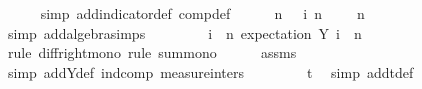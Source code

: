 \begin{isabellebody}
\ \ \ \ \isamarkupfalse%
\ {\isacharparenleft}{\kern0pt}simp\ add{\isacharcolon}{\kern0pt}indicator{\isacharunderscore}{\kern0pt}def\ comp{\isacharunderscore}{\kern0pt}def{\isacharparenright}{\kern0pt}\isanewline
\isanewline
\ \ \isamarkupfalse%
\ {\isachardoublequoteopen}{\isasymalpha}\ {\isacharasterisk}{\kern0pt}\ n\ {\isasymle}\ {\isacharparenleft}{\kern0pt}{\isasymSum}\ i\ {\isacharequal}{\kern0pt}{}{\isachardot}{\kern0pt}{\isachardot}{\kern0pt}{\isacharless}{\kern0pt}n{\isachardot}{\kern0pt}\ {}{\isacharslash}{\kern0pt}{}\ {\isacharplus}{\kern0pt}\ {\isasymalpha}{\isacharparenright}{\kern0pt}\ {\isacharminus}{\kern0pt}\ n{\isacharslash}{\kern0pt}{}{\isachardoublequoteclose}\isanewline
\ \ \ \ \isamarkupfalse%
\ {\isacharparenleft}{\kern0pt}simp\ add{\isacharcolon}{\kern0pt}algebra{\isacharunderscore}{\kern0pt}simps{\isacharparenright}{\kern0pt}\isanewline
\ \ \isamarkupfalse%
\ \isamarkupfalse%
\ {\isachardoublequoteopen}{\isachardot}{\kern0pt}{\isachardot}{\kern0pt}{\isachardot}{\kern0pt}\ {\isasymle}\ {\isacharparenleft}{\kern0pt}{\isasymSum}\ i\ {\isacharequal}{\kern0pt}\ {}{\isachardot}{\kern0pt}{\isachardot}{\kern0pt}{\isacharless}{\kern0pt}n{\isachardot}{\kern0pt}\ expectation\ {\isacharparenleft}{\kern0pt}Y\ i{\isacharparenright}{\kern0pt}{\isacharparenright}{\kern0pt}\ {\isacharminus}{\kern0pt}\ n{\isacharslash}{\kern0pt}{}{\isachardoublequoteclose}\isanewline
\ \ \ \ \isamarkupfalse%
\ {\isacharparenleft}{\kern0pt}rule\ diff{\isacharunderscore}{\kern0pt}right{\isacharunderscore}{\kern0pt}mono{\isacharcomma}{\kern0pt}\ rule\ sum{\isacharunderscore}{\kern0pt}mono{\isacharparenright}{\kern0pt}\isanewline
\ \ \ \ \isamarkupfalse%
\ assms{\isacharparenleft}{\kern0pt}{}{\isacharparenright}{\kern0pt}\ \isamarkupfalse%
\ {\isacharparenleft}{\kern0pt}simp\ add{\isacharcolon}{\kern0pt}Y{\isacharunderscore}{\kern0pt}def\ ind{\isacharunderscore}{\kern0pt}comp\ measure{\isacharunderscore}{\kern0pt}inters{\isacharparenright}{\kern0pt}\ \isanewline
\ \ \isamarkupfalse%
\ \isamarkupfalse%
\ {\isachardoublequoteopen}{\isachardot}{\kern0pt}{\isachardot}{\kern0pt}{\isachardot}{\kern0pt}\ {\isacharequal}{\kern0pt}\ t{\isachardoublequoteclose}\ \isamarkupfalse%
\ {\isacharparenleft}{\kern0pt}simp\ add{\isacharcolon}{\kern0pt}t{\isacharunderscore}{\kern0pt}def{\isacharparenright}{\kern0pt}\isanewline

\end{isabellebody}
